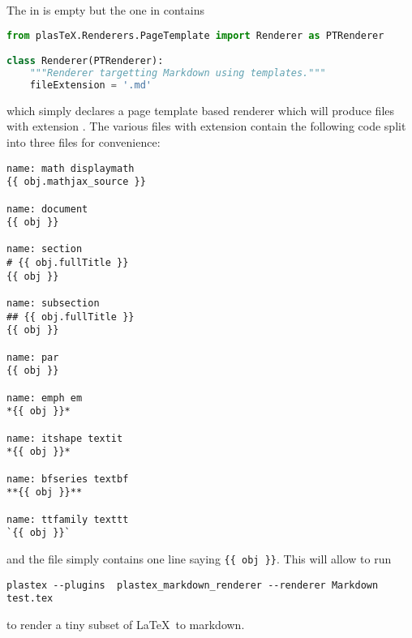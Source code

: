 The  in  is empty but the one in
 contains
\begin{lstlisting}[language=python]
from plasTeX.Renderers.PageTemplate import Renderer as PTRenderer

class Renderer(PTRenderer):
    """Renderer targetting Markdown using templates."""
    fileExtension = '.md'
\end{lstlisting}
which simply declares a page template based renderer which will produce files with extension .
The various files with  extension contain the following code split into three files for convenience:
\begin{lstlisting}
name: math displaymath
{{ obj.mathjax_source }}

name: document
{{ obj }}

name: section
# {{ obj.fullTitle }}
{{ obj }}

name: subsection
## {{ obj.fullTitle }}
{{ obj }}

name: par
{{ obj }}

name: emph em
*{{ obj }}*

name: itshape textit
*{{ obj }}*

name: bfseries textbf
**{{ obj }}**

name: ttfamily texttt
`{{ obj }}`
\end{lstlisting}

and the file  simply contains one line saying
\verb+{{ obj }}+. This will allow to run

\begin{verbatim}
plastex --plugins  plastex_markdown_renderer --renderer Markdown test.tex
\end{verbatim}
to render a tiny subset of \LaTeX\ to markdown.
